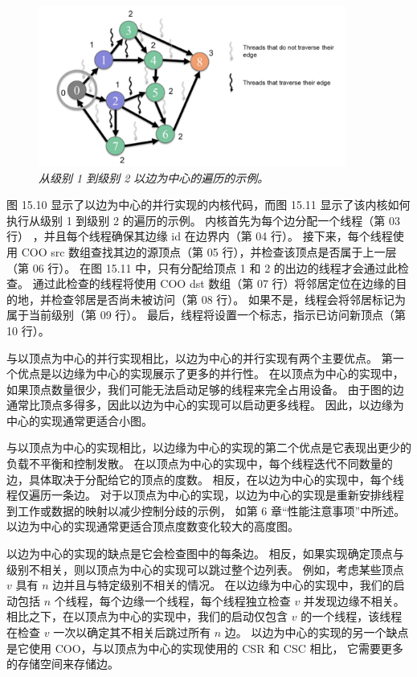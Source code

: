 \begin{figure}[H]
	\centering
	\includegraphics[width=0.9\textwidth]{figs/F15.11.png}
	\caption{\textit{从级别 1 到级别 2 以边为中心的遍历的示例。}}
\end{figure}

图 15.10 显示了以边为中心的并行实现的内核代码，而图 15.11 显示了该内核如何执行从级别 1 到级别 2 的遍历的示例。
内核首先为每个边分配一个线程（第 03 行） ，并且每个线程确保其边缘 id 在边界内（第 04 行）。 
接下来，每个线程使用 COO src 数组查找其边的源顶点（第 05 行），并检查该顶点是否属于上一层（第 06 行）。 
在图 15.11 中，只有分配给顶点 1 和 2 的出边的线程才会通过此检查。 
通过此检查的线程将使用 COO dst 数组（第 07 行）将邻居定位在边缘的目的地，并检查邻居是否尚未被访问（第 08 行）。 
如果不是，线程会将邻居标记为属于当前级别（第 09 行）。 最后，线程将设置一个标志，指示已访问新顶点（第 10 行）。

与以顶点为中心的并行实现相比，以边为中心的并行实现有两个主要优点。 第一个优点是以边缘为中心的实现展示了更多的并行性。 
在以顶点为中心的实现中，如果顶点数量很少，我们可能无法启动足够的线程来完全占用设备。 
由于图的边通常比顶点多得多，因此以边为中心的实现可以启动更多线程。 因此，以边缘为中心的实现通常更适合小图。

与以顶点为中心的实现相比，以边缘为中心的实现的第二个优点是它表现出更少的负载不平衡和控制发散。 
在以顶点为中心的实现中，每个线程迭代不同数量的边，具体取决于分配给它的顶点的度数。 
相反，在以边为中心的实现中，每个线程仅遍历一条边。 
对于以顶点为中心的实现，以边为中心的实现是重新安排线程到工作或数据的映射以减少控制分歧的示例，
如第 6 章“性能注意事项”中所述。 以边为中心的实现通常更适合顶点度数变化较大的高度图。

以边为中心的实现的缺点是它会检查图中的每条边。 相反，如果实现确定顶点与级别不相关，则以顶点为中心的实现可以跳过整个边列表。 
例如，考虑某些顶点 $v$ 具有 $n$ 边并且与特定级别不相关的情况。 
在以边缘为中心的实现中，我们的启动包括 $n$ 个线程，每个边缘一个线程，每个线程独立检查 $v$ 并发现边缘不相关。 
相比之下，在以顶点为中心的实现中，我们的启动仅包含 $v$ 的一个线程，该线程在检查 $v$ 一次以确定其不相关后跳过所有 $n$ 边。 
以边为中心的实现的另一个缺点是它使用 $\mathrm{COO}$，与以顶点为中心的实现使用的 CSR 和 CSC 相比，
它需要更多的存储空间来存储边。


